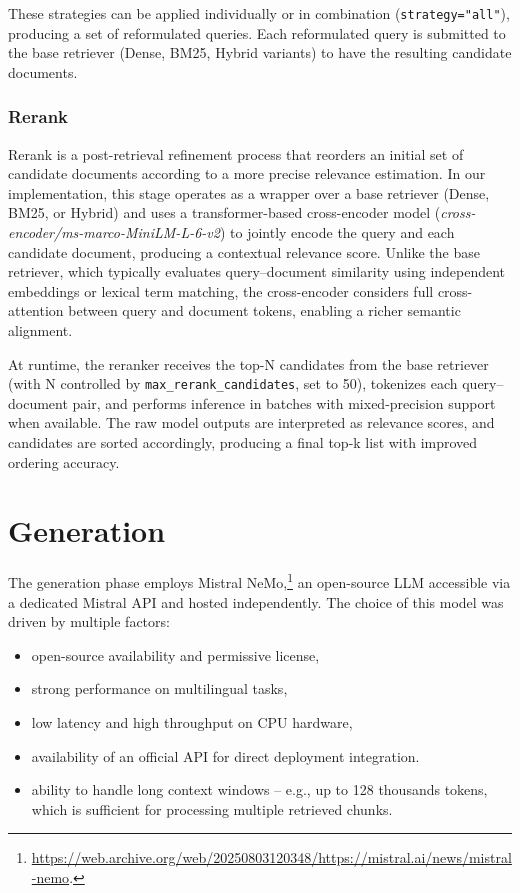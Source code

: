 \begin{spacing}{1.5}
These strategies can be applied individually or in combination (\texttt{strategy="all"}), producing a set of reformulated queries. Each reformulated query is submitted to the base retriever (Dense, BM25, Hybrid variants) to have the resulting candidate documents.\\


\noindent\subsubsection*{\Large Rerank}

Rerank is a post-retrieval refinement process that reorders an initial set of candidate documents according to a more precise relevance estimation. In our implementation, this stage operates as a wrapper over a base retriever (Dense, BM25, or Hybrid) and uses a transformer-based cross-encoder model (\textit{cross-encoder/ms-marco-MiniLM-L-6-v2}) to jointly encode the query and each candidate document, producing a contextual relevance score. Unlike the base retriever, which typically evaluates query–document similarity using independent embeddings or lexical term matching, the cross-encoder considers full cross-attention between query and document tokens, enabling a richer semantic alignment.

At runtime, the reranker receives the top-N candidates from the base retriever (with N controlled by \texttt{max\_rerank\_candidates}, set to 50), tokenizes each query–document pair, and performs inference in batches with mixed-precision support when available. The raw model outputs are interpreted as relevance scores, and candidates are sorted accordingly, producing a final top-k list with improved ordering accuracy.


\section{Generation}
The generation phase employs Mistral NeMo,\footnote{\url{https://web.archive.org/web/20250803120348/https://mistral.ai/news/mistral-nemo}.\nocite{noauthor_mistral_2025}} an open-source LLM accessible via a dedicated Mistral API and hosted independently. The choice of this model was driven by multiple factors:
\begin{itemize}
      \item open-source availability and permissive license,
      \item strong performance on multilingual tasks,
      \item low latency and high throughput on CPU hardware,
      \item availability of an official API for direct deployment integration.
      \item ability to handle long context windows -- e.g., up to 128 thousands tokens, which is sufficient for processing multiple retrieved chunks.
\end{itemize}


\end{spacing}
